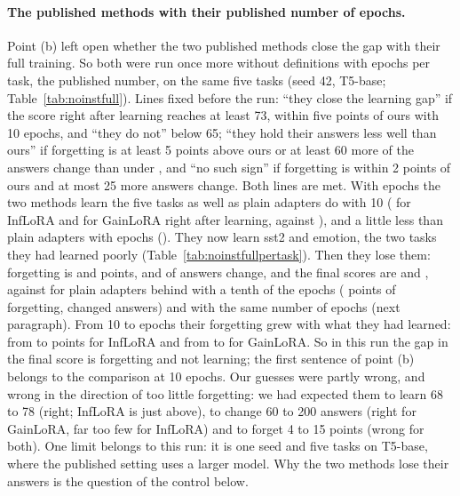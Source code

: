 \paragraph{The published methods with their published number of epochs.} Point (b) left open whether the two published methods close the gap with their full training. So both were run once more without definitions with \AudFullEpochs{} epochs per task, the published number, on the same five tasks (seed 42, T5-base; Table~\ref{tab:noinstfull}).
Lines fixed before the run: ``they close the learning gap'' if the score right after learning reaches at least 73, within five points of ours with 10 epochs, and ``they do not'' below 65; ``they hold their answers less well than ours'' if forgetting is at least 5 points above ours or at least 60 more of the \AudFullCompared{} answers change than under \recog{}, and ``no such sign'' if forgetting is within 2 points of ours and at most 25 more answers change.
Both lines are met.
With \AudFullEpochs{} epochs the two methods learn the five tasks as well as plain adapters do with 10 (\AudFullInfloraLearned{} for InfLoRA and \AudFullGainloraLearned{} for GainLoRA right after learning, against \AudOursRidgeLearned{}), and a little less than plain adapters with \AudFullEpochs{} epochs (\AudFullOursRidgeLearned{}). They now learn sst2 and emotion, the two tasks they had learned poorly (Table~\ref{tab:noinstfullpertask}).
Then they lose them: forgetting is \AudFullInfloraFT{} and \AudFullGainloraFT{} points, \AudFullInfloraChanged{} and \AudFullGainloraChanged{} of \AudFullCompared{} answers change, and the final scores are \AudFullInfloraAP{} and \AudFullGainloraAP{}, against \AudOursRidgeAP{} for plain adapters behind \recog{} with a tenth of the epochs (\AudOursRidgeFT{} points of forgetting, \AudOursRidgeChanged{} changed answers) and \AudFullOursRidgeAP{} with the same number of epochs (next paragraph).
From 10 to \AudFullEpochs{} epochs their forgetting grew with what they had learned: from \AudPubInfloraNoDefFT{} to \AudFullInfloraFT{} points for InfLoRA and from \AudPubGainloraNoDefFT{} to \AudFullGainloraFT{} for GainLoRA.
So in this run the gap in the final score is forgetting and not learning; the first sentence of point (b) belongs to the comparison at 10 epochs.
Our guesses were partly wrong, and wrong in the direction of too little forgetting: we had expected them to learn 68 to 78 (right; InfLoRA is just above), to change 60 to 200 answers (right for GainLoRA, far too few for InfLoRA) and to forget 4 to 15 points (wrong for both).
One limit belongs to this run: it is one seed and five tasks on T5-base, where the published setting uses a larger model. Why the two methods lose their answers is the question of the control below.

